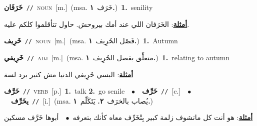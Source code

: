 \documentclass[10pt,a4paper,twoside]{article} %
\begin{document}
\begin{multicols}{2}
{\setlength\topsep{0pt}\textbf{\foreignlanguage{arabic}{خَرَفَان}}\ {\color{gray}\texttt{//}\color{black}}\ \textsc{noun}\ [m.]\ \color{gray}(msa. \foreignlanguage{arabic}{خَرَف}~\foreignlanguage{arabic}{\textbf{١.}})\color{black}\ \textbf{1.}~senility\  \begin{flushright}\color{gray}\foreignlanguage{arabic}{\textbf{\underline{\foreignlanguage{arabic}{أمثلة}}}: الخَرَفان اللي عند أمك بيروحش. حاول تتأقلموا كلكم عليه.}\end{flushright}\color{black}} \vspace{2mm}

{\setlength\topsep{0pt}\textbf{\foreignlanguage{arabic}{خَرِيف}}\ {\color{gray}\texttt{//}\color{black}}\ \textsc{noun}\ [m.]\ \color{gray}(msa. \foreignlanguage{arabic}{فَصْل الخَرِيف}~\foreignlanguage{arabic}{\textbf{١.}})\color{black}\ \textbf{1.}~Autumn\ } \vspace{2mm}

{\setlength\topsep{0pt}\textbf{\foreignlanguage{arabic}{خَرِيفي}}\ {\color{gray}\texttt{//}\color{black}}\ \textsc{adj}\ [m.]\ \color{gray}(msa. \foreignlanguage{arabic}{متعلِّق بفصل الخَرِيف}~\foreignlanguage{arabic}{\textbf{١.}})\color{black}\ \textbf{1.}~relating to autumn\  \begin{flushright}\color{gray}\foreignlanguage{arabic}{\textbf{\underline{\foreignlanguage{arabic}{أمثلة}}}: البسي خَرِيفي الدنيا مش كثير برد لسة}\end{flushright}\color{black}} \vspace{2mm}

{\setlength\topsep{0pt}\textbf{\foreignlanguage{arabic}{خَرَّف}}\ {\color{gray}\texttt{//}\color{black}}\ \textsc{verb}\ [p.]\ \textbf{1.}~talk  \textbf{2.}~go senile\ \ $\bullet$\ \ \setlength\topsep{0pt}\textbf{\foreignlanguage{arabic}{خَرِّف}}\ {\color{gray}\texttt{//}\color{black}}\ [c.]\ \ $\bullet$\ \ \setlength\topsep{0pt}\textbf{\foreignlanguage{arabic}{يخَرِّف}}\ {\color{gray}\texttt{//}\color{black}}\ [i.]\ \color{gray}(msa. \foreignlanguage{arabic}{يُصاب بالخرَف}~\foreignlanguage{arabic}{\textbf{٢.}}  \foreignlanguage{arabic}{يَتَكَلّم}~\foreignlanguage{arabic}{\textbf{١.}})\color{black}\  \begin{flushright}\color{gray}\foreignlanguage{arabic}{\textbf{\underline{\foreignlanguage{arabic}{أمثلة}}}: هو أنت كل ماتشوف زلمة كبير بِتْخَرِّف معاه كأنك بتعرفه\ $\bullet$\ \  أبوها خَرَّف مسكين}\end{flushright}\color{black}} \vspace{2mm}


\end{multicols}
\end{document}
